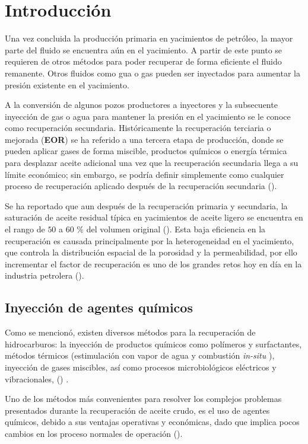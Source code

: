 \chapter{Introducción}
\label{chp:introduccion}

Una vez concluida la producción primaria en yacimientos de petróleo, la mayor parte del fluido se encuentra aún en el yacimiento. A partir de este punto se requieren de otros métodos para poder recuperar de forma eficiente el fluido remanente. Otros fluidos como gua o gas pueden ser inyectados para aumentar la presión existente en el yacimiento.

A la conversión de algunos pozos productores a inyectores y la subsecuente inyección de gas o agua para mantener la presión en el yacimiento se le conoce como recuperación secundaria. Históricamente la recuperación terciaria o mejorada (\textbf{EOR}) se ha referido a una tercera etapa de producción, donde se pueden aplicar gases de forma miscible, productos químicos o energía térmica para desplazar aceite adicional una vez que la recuperación secundaria llega a su límite económico; sin embargo, se podría definir simplemente como cualquier proceso de recuperación aplicado después de la recuperación secundaria (\cite{Lake}).

Se ha reportado que aun después de la recuperación primaria y secundaria, la saturación de aceite residual típica en yacimientos de aceite ligero se encuentra en el rango de $50$ a $60$ \% del volumen original (\cite{Moritis}). Esta baja eficiencia en la recuperación es causada principalmente por la heterogeneidad en el yacimiento, que controla la distribución espacial de la porosidad y la permeabilidad, por ello incrementar el factor de recuperación es uno de los grandes retos hoy en día en la industria petrolera (\cite{Alvarado}).


\section{Inyección de agentes químicos}

Como se mencionó, existen diversos métodos para la recuperación de hidrocarburos: la inyección de productos químicos como polímeros y surfactantes, métodos térmicos (estimulación con vapor de agua y combustión \textit{in-situ} ), inyección de gases miscibles, así como procesos microbiológicos eléctricos y vibracionales, (\cite{Ali1996}) .

Uno de los métodos más convenientes para resolver los complejos problemas presentados durante la recuperación de aceite crudo, es el uso de agentes químicos, debido a sus ventajas operativas y económicas, dado que implica pocos cambios en los proceso normales de operación (\cite{Sheng2010}).

